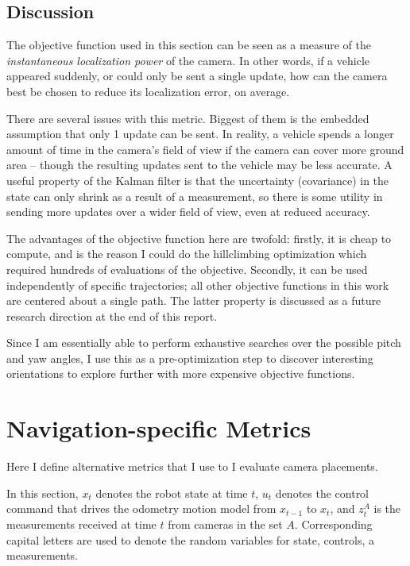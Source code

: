 \documentclass[a4paper,12pt,twoside,openright]{report}
\begin{document}
\subsection{Discussion}

The objective function used in this section can be seen as
a measure of the \textit{instantaneous localization power}
of the camera. In other words, if a vehicle appeared suddenly, or
could only be sent a single update, how can the camera best be chosen
to reduce its localization error, on average.

There are several issues with this metric. Biggest of them
is the embedded assumption that only 1 update can be sent.
In reality, a vehicle spends a longer amount of time in the camera's
field of view if the camera can cover more ground area -- 
though the resulting updates sent to the vehicle may be
less accurate. A useful property of the Kalman
filter is that the uncertainty (covariance) in the state
can only shrink as a result of a measurement, so there is some
utility in sending more updates over a wider field of view,
even at reduced accuracy. 

The advantages of the objective function here are twofold:
firstly, it is cheap to compute, and is the reason I could
do the hillclimbing optimization which
required hundreds of evaluations of the objective. Secondly,
it can be used independently of specific trajectories; all
other objective functions in this work are centered about
a single path. The latter property is discussed 
as a future research direction at the end of this report.

Since I am essentially able to perform exhaustive searches
over the possible pitch and yaw angles, I use this
as a pre-optimization step to discover interesting orientations
to explore further with more expensive objective functions.




\section{Navigation-specific Metrics}

Here I define alternative metrics that I use to
I evaluate camera placements. 

In this section, $x_t$ denotes the robot
state at time $t$, $u_t$ denotes the control command
that drives the odometry motion model from $x_{t-1}$ to
$x_{t}$, and $z^{A}_{t}$ is the measurements received
at time $t$ from cameras in the set $A$. Corresponding
capital letters are used to denote the random variables
for state, controls, a measurements.
\end{document}
